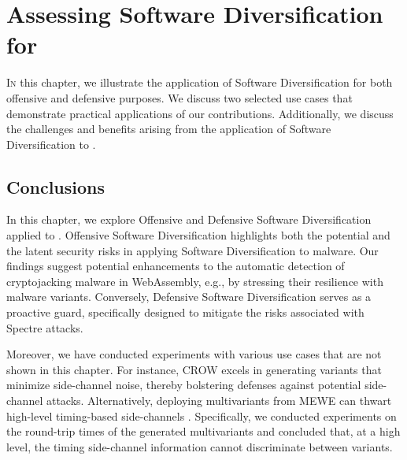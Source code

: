 \chapter{Assessing Software Diversification for \Wasm}
\label{exploit}




\vspace{12mm}

\lettrine[lines=3]{I}{n} this chapter, we illustrate the application of Software Diversification for both offensive and defensive purposes.
We discuss two selected use cases that demonstrate practical applications of our contributions.
Additionally, we discuss the challenges and benefits arising from the application of Software Diversification to \Wasm.









% 

\section*{Conclusions}
In this chapter, we explore Offensive and Defensive Software Diversification applied to \Wasm.
Offensive Software Diversification highlights both the potential and the latent security risks in applying Software Diversification to \Wasm malware. 
Our findings suggest potential enhancements to the automatic detection of cryptojacking malware in WebAssembly, e.g., by stressing their resilience with \Wasm malware variants. 
Conversely, Defensive Software Diversification serves as a proactive guard, specifically designed to mitigate the risks associated with Spectre attacks. 

Moreover, we have conducted experiments with various use cases that are not shown in this chapter.
For instance, CROW \cite{CROW} excels in generating \Wasm variants that minimize side-channel noise, thereby bolstering defenses against potential side-channel attacks. 
Alternatively, deploying multivariants from MEWE \cite{MEWE} can thwart high-level timing-based side-channels \cite{morgan2015web}. 
Specifically, we conducted experiments on the round-trip times of the generated multivariants and concluded that, at a high level, the timing side-channel information cannot discriminate between variants. 
